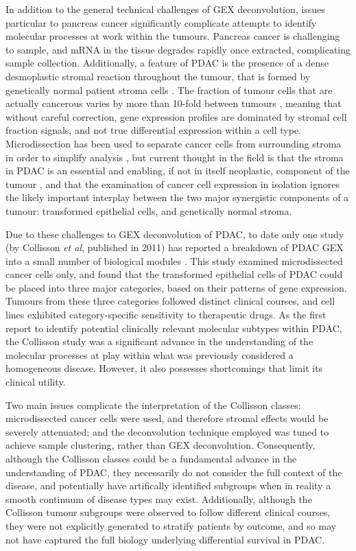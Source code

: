 \documentclass[dissertation.tex]{subfiles}
\begin{document}
In addition to the general technical challenges of \gls{GEX} deconvolution, issues particular to pancreas cancer significantly complicate attempts to identify molecular processes at work within the tumours.  Pancreas cancer is challenging to sample, and mRNA in the tissue degrades rapidly once extracted, complicating sample collection.  Additionally, a feature of \gls{PDAC} is the presence of a dense desmoplastic stromal reaction throughout the tumour, that is formed by genetically normal patient stroma cells \cite{Mahadevan2007}.  The fraction of tumour cells that are actually cancerous varies by more than 10-fold between tumours \cite{Biankin2012}, meaning that without careful correction, gene expression profiles are dominated by stromal cell fraction signals, and not true differential expression within a cell type.  Microdissection has been used to separate cancer cells from surrounding stroma in order to simplify analysis \cite{Collisson2011}, but current thought in the field is that the stroma in \gls{PDAC} is an essential and enabling, if not in itself neoplastic, component of the tumour \cite{Mahadevan2007}, and that the examination of cancer cell expression in isolation ignores the likely important interplay between the two major synergistic components of a tumour: transformed epithelial cells, and genetically normal stroma.

Due to these challenges to \gls{GEX} deconvolution of \gls{PDAC}, to date only one study (by Collisson \emph{et al}, published in 2011) has reported a breakdown of \gls{PDAC} \gls{GEX} into a small number of biological modules \cite{Collisson2011}.  This study examined microdissected cancer cells only, and found that the transformed epithelial cells of \gls{PDAC} could be placed into three major categories, based on their patterns of gene expression.  Tumours from these three categories followed distinct clinical courses, and cell lines exhibited category-specific sensitivity to therapeutic drugs.  As the first report to identify potential clinically relevant molecular subtypes within \gls{PDAC}, the Collisson study was a significant advance in the understanding of the molecular processes at play within what was previously considered a homogeneous disease.  However, it also possesses shortcomings that limit its clinical utility.

Two main issues complicate the interpretation of the Collisson classes: microdissected cancer cells were used, and therefore stromal effects would be severely attenuated; and the deconvolution technique employed was tuned to achieve sample clustering, rather than \gls{GEX} deconvolution.  Consequently, although the Collisson classes could be a fundamental advance in the understanding of \gls{PDAC}, they necessarily do not consider the full context of the disease, and potentially have artifically identified subgroups when in reality a smooth continuum of disease types may exist.  Additionally, although the Collisson tumour subgroups were observed to follow different clinical courses, they were not explicitly generated to stratify patients by outcome, and so may not have captured the full biology underlying differential survival in \gls{PDAC}.
\end{document}
